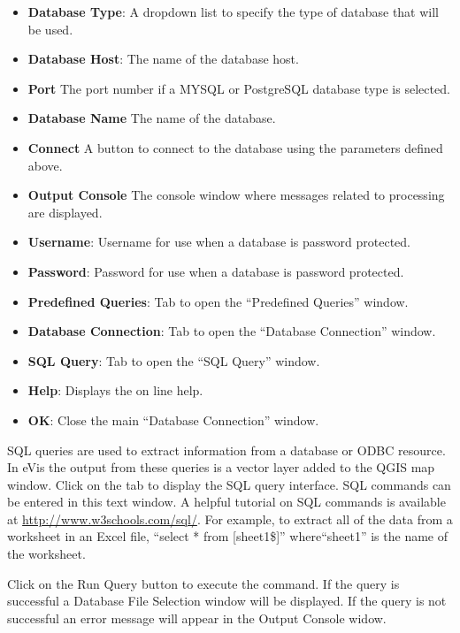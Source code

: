 \begin{itemize}[label=--]
\item \textbf{Database Type}: A dropdown list to specify the type of database that will be used.
\item \textbf{Database Host}: The name of the database host.
\item \textbf{Port} The port number if a MYSQL or PostgreSQL database type is selected.
\item \textbf{Database Name} The name of the database.
\item \textbf{Connect} A button to connect to the database using the parameters defined above.
\item \textbf{Output Console} The console window where messages related to processing are
displayed.
\item \textbf{Username}: Username for use when a database is password protected.
\item \textbf{Password}: Password for use when a database is password protected.
\item \textbf{Predefined Queries}: Tab to open the ``Predefined Queries'' window.
\item \textbf{Database Connection}: Tab to open the ``Database Connection'' window.
\item \textbf{SQL Query}: Tab to open the ``SQL Query'' window.
\item \textbf{Help}: Displays the on line help.
\item \textbf{OK}: Close the main ``Database Connection'' window.
\end{itemize}

\label{evis_running_sql}

SQL queries are used to extract information from a database or ODBC resource. In eVis the output
from these queries is a vector layer added to the QGIS map window. Click on the  tab
to display the SQL query interface. SQL commands can be entered in this text window. A helpful
tutorial on SQL commands is available at \url{http://www.w3schools.com/sql/}. For example, to
extract all of the data from a worksheet in an Excel file, ``select * from [sheet1\$]''
where``sheet1'' is the name of the worksheet.

Click on the Run Query button to execute the command. If the query is successful a Database File
Selection window will be displayed. If the query is not successful an error message will appear in
the Output Console widow.

